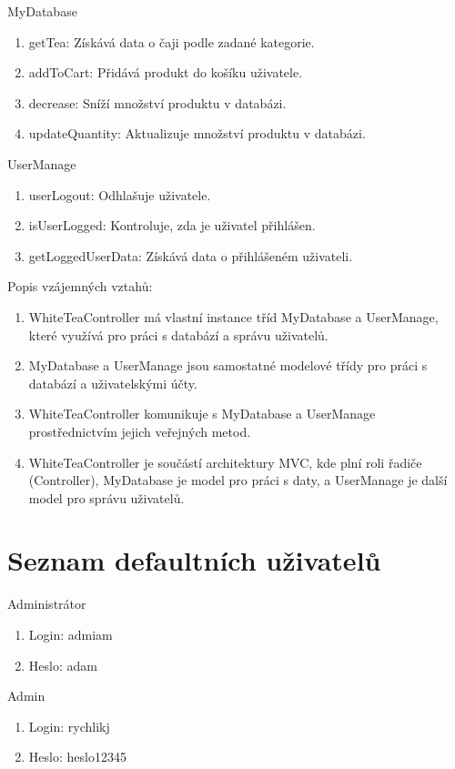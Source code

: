 \documentclass[12pt, a4paper]{report}
\begin{document}
MyDatabase
\begin{enumerate}[left=1cm]
    \item getTea: Získává data o čaji podle zadané kategorie.
    \item addToCart: Přidává produkt do košíku uživatele.
    \item decrease: Sníží množství produktu v databázi.
    \item updateQuantity: Aktualizuje množství produktu v databázi.
\end{enumerate} 

UserManage
\begin{enumerate}[left=1cm]
    \item userLogout: Odhlašuje uživatele.
    \item isUserLogged: Kontroluje, zda je uživatel přihlášen.
    \item getLoggedUserData: Získává data o přihlášeném uživateli.
\end{enumerate}

Popis vzájemných vztahů:
\begin{enumerate}[left=1cm]
    \item WhiteTeaController má vlastní instance tříd MyDatabase a UserManage, které využívá pro práci s databází a správu uživatelů.
    \item MyDatabase a UserManage jsou samostatné modelové třídy pro práci s databází a uživatelskými účty.
    \item WhiteTeaController komunikuje s MyDatabase a UserManage prostřednictvím jejich veřejných metod.
    \item WhiteTeaController je součástí architektury MVC, kde plní roli řadiče (Controller), MyDatabase je model pro práci s daty, a UserManage je další model pro správu uživatelů.
\end{enumerate}


\section{Seznam defaultních uživatelů}

Administrátor
\begin{enumerate}[left=1cm]
    \item Login: admiam
    \item Heslo: adam
\end{enumerate}

Admin
\begin{enumerate}[left=1cm]
    \item Login: rychlikj
    \item Heslo: heslo12345
\end{enumerate}
\end{document}
